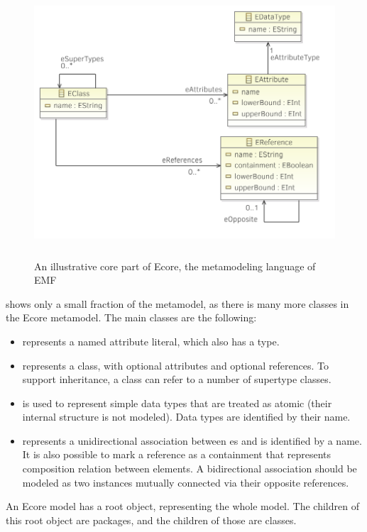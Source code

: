 \begin{figure}[!ht]
	\centering
	\includegraphics[height=10cm]{include/figures/Ecore}
	\caption{An illustrative core part of Ecore, the metamodeling language of EMF}
	\label{fig:Ecore}
\end{figure}

 shows only a small fraction of the metamodel, as there is many more classes in the Ecore metamodel. The main classes are the following:
\begin{itemize}[topsep=0pt]
	\item {} represents a named attribute literal, which also has a type.
	\item {} represents a class, with optional attributes and optional references. To support inheritance, a class can refer to a number of supertype classes.
	\item {} is used to represent simple data types that are treated as atomic (their internal structure is not modeled). Data types are identified by their name.
	\item {} represents a unidirectional association between es and is identified by a name. It is also possible to mark a reference as a containment that represents composition relation between elements. A bidirectional association should be modeled as two  instances mutually connected via their opposite references.
\end{itemize}

An Ecore model has a root object, representing the whole model. The children of this root object are packages, and the children of those are classes.

